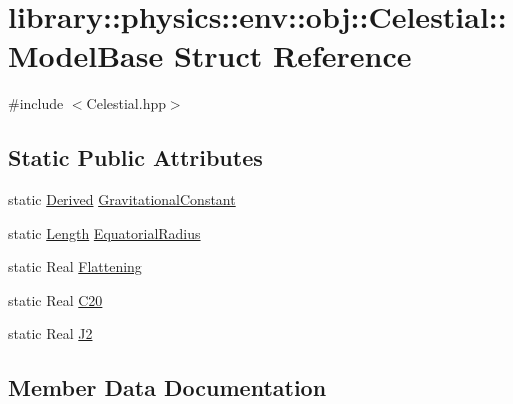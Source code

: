 \hypertarget{structlibrary_1_1physics_1_1env_1_1obj_1_1_celestial_1_1_model_base}{}\section{library\+:\+:physics\+:\+:env\+:\+:obj\+:\+:Celestial\+:\+:Model\+Base Struct Reference}
\label{structlibrary_1_1physics_1_1env_1_1obj_1_1_celestial_1_1_model_base}


{\ttfamily \#include $<$Celestial.\+hpp$>$}

\subsection*{Static Public Attributes}
\begin{DoxyCompactItemize}
\item 
static \hyperlink{classlibrary_1_1physics_1_1units_1_1_derived}{Derived} \hyperlink{structlibrary_1_1physics_1_1env_1_1obj_1_1_celestial_1_1_model_base_ad73a53a68ccb2aa2e0994ede1d128ad5}{Gravitational\+Constant}
\item 
static \hyperlink{classlibrary_1_1physics_1_1units_1_1_length}{Length} \hyperlink{structlibrary_1_1physics_1_1env_1_1obj_1_1_celestial_1_1_model_base_a0d82235af2ed136eb0a46ba4cd3f4d85}{Equatorial\+Radius}
\item 
static Real \hyperlink{structlibrary_1_1physics_1_1env_1_1obj_1_1_celestial_1_1_model_base_ac035d69e3827f37130a5ee3977586a54}{Flattening}
\item 
static Real \hyperlink{structlibrary_1_1physics_1_1env_1_1obj_1_1_celestial_1_1_model_base_ab653a41c85c2974d426e82a4d18ad9b4}{C20}
\item 
static Real \hyperlink{structlibrary_1_1physics_1_1env_1_1obj_1_1_celestial_1_1_model_base_a9016f0c506cfd899a9854c052419c653}{J2}
\end{DoxyCompactItemize}


\subsection{Member Data Documentation}
\mbox{\label{structlibrary_1_1physics_1_1env_1_1obj_1_1_celestial_1_1_model_base_ab653a41c85c2974d426e82a4d18ad9b4}} 
